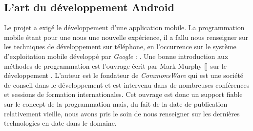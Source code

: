 \subsection{L'art du développement Android}
Le projet a exigé le développement d'une application mobile. La programmation mobile étant pour une nous une nouvelle expérience, il a fallu nous renseigner sur les techniques de développement sur téléphone, en l'occurrence sur le système d'exploitation mobile développé par \textit{Google} : \android{}. Une bonne introduction aux méthodes de programmation est l'ouvrage écrit par Mark Murphy [\cite{murphy2010art}] sur le développement \android{}. L'auteur est le fondateur de \textit{CommonsWare} qui est une société de conseil dans le développement \android{} et est intervenu dans de nombreuses conférences et sessions de formation internationales. Cet ouvrage est donc un support fiable sur le concept de la programmation \android{} mais, du fait de la date de publication relativement vieille, nous avons pris le soin de nous renseigner sur les dernières technologies en date dans le domaine.